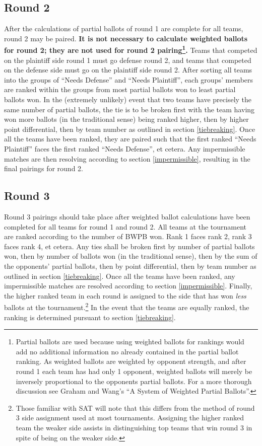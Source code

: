 \documentclass{article}
\begin{document}
\subsection{Round 2}
After the calculations of partial ballots of round 1 are complete for all teams, round 2 may be paired.  \textbf{It is not necessary to calculate weighted ballots for round 2; they are not used for round 2 pairing\footnote{Partial ballots are used because using weighted ballots for rankings would add no additional information no already contained in the partial ballot ranking.  As weighted ballots are weighted by opponent strength, and after round 1 each team has had only 1 opponent, weighted ballots will merely be inversely proportional to the opponents partial ballots.  For a more thorough discussion see Graham and Wang's ``A System of Weighted Partial Ballots''.}.}  Teams that competed on the plaintiff side round 1 must go defense round 2, and teams that competed on the defense side must go on the plaintiff side round 2.  After sorting all teams into the groups of ``Needs Defense'' and ``Needs Plaintiff'', each groups' members are ranked within the groups from most partial ballots won to least partial ballots won.  In the (extremely unlikely) event that two teams have precisely the same number of partial ballots, the tie is to be broken first with the team having won more ballots (in the traditional sense) being ranked higher, then by higher point differential, then by team number as outlined in section \ref{tiebreaking}.  Once all the teams have been ranked, they are paired such that the first ranked ``Needs Plaintiff'' faces the first ranked ``Needs Defense'', et cetera.  Any impermissible matches are then resolving according to section \ref{impermissible}, resulting in the final pairings for round 2.
\subsection{Round 3}
Round 3 pairings should take place after weighted ballot calculations have been completed for all teams for round 1 and round 2.  All teams at the tournament are ranked according to the number of BWPB won.  Rank 1 faces rank 2, rank 3 faces rank 4, et cetera.  Any ties shall be broken first by number of partial ballots won, then by number of ballots won (in the traditional sense), then by the sum of the opponents' partial ballots, then by point differential, then by team number as outlined in section \ref{tiebreaking}.  Once all the teams have been ranked, any impermissible matches are resolved according to section \ref{impermissible}.  Finally, the higher ranked team in each round is assigned to the side that has won \textit{less} ballots at the tournament.\footnote{Those familiar with SAT will note that this differs from the method of round 3 side assignment used at most tournaments.  Assigning the higher ranked team the weaker side assists in distinguishing top teams that win round $3$ in spite of being on the weaker side.}  In the event that the teams are equally ranked, the ranking is determined pursuant to section \ref{tiebreaking}.
\end{document}
